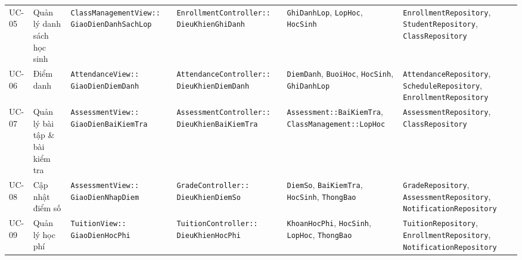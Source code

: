 \documentclass[11pt,a4paper]{report}
\begin{document}
\begin{landscape}
\begin{table}[p]
\begin{tabularx}{\linewidth}{@{}l >{\raggedright\arraybackslash}p{3.2cm} >{\raggedright\arraybackslash}p{4.2cm} >{\raggedright\arraybackslash}p{4.6cm} >{\raggedright\arraybackslash}p{4.8cm} >{\raggedright\arraybackslash}X@{}}
    UC-05 & Quản lý danh sách học sinh & \texttt{ClassManagementView::} \newline \texttt{GiaoDienDanhSachLop} & \texttt{EnrollmentController::} \newline \texttt{DieuKhienGhiDanh} & \texttt{GhiDanhLop}, \texttt{LopHoc}, \newline \texttt{HocSinh} & \texttt{EnrollmentRepository}, \newline \texttt{StudentRepository}, \newline \texttt{ClassRepository} \\
    UC-06 & Điểm danh & \texttt{AttendanceView::} \newline \texttt{GiaoDienDiemDanh} & \texttt{AttendanceController::} \newline \texttt{DieuKhienDiemDanh} & \texttt{DiemDanh}, \texttt{BuoiHoc}, \newline \texttt{HocSinh}, \texttt{GhiDanhLop} & \texttt{AttendanceRepository}, \newline \texttt{ScheduleRepository}, \newline \texttt{EnrollmentRepository} \\
    UC-07 & Quản lý bài tập \& bài kiểm tra & \texttt{AssessmentView::} \newline \texttt{GiaoDienBaiKiemTra} & \texttt{AssessmentController::} \newline \texttt{DieuKhienBaiKiemTra} & \texttt{Assessment::BaiKiemTra}, \newline \texttt{ClassManagement::LopHoc} & \texttt{AssessmentRepository}, \newline \texttt{ClassRepository} \\
    UC-08 & Cập nhật điểm số & \texttt{AssessmentView::} \newline \texttt{GiaoDienNhapDiem} & \texttt{GradeController::} \newline \texttt{DieuKhienDiemSo} & \texttt{DiemSo}, \texttt{BaiKiemTra}, \newline \texttt{HocSinh}, \texttt{ThongBao} & \texttt{GradeRepository}, \newline \texttt{AssessmentRepository}, \newline \texttt{NotificationRepository} \\
    UC-09 & Quản lý học phí & \texttt{TuitionView::} \newline \texttt{GiaoDienHocPhi} & \texttt{TuitionController::} \newline \texttt{DieuKhienHocPhi} & \texttt{KhoanHocPhi}, \texttt{HocSinh}, \newline \texttt{LopHoc}, \texttt{ThongBao} & \texttt{TuitionRepository}, \newline \texttt{EnrollmentRepository}, \newline \texttt{NotificationRepository} \\

\end{tabularx}
\end{table}
\end{landscape}
\end{document}
